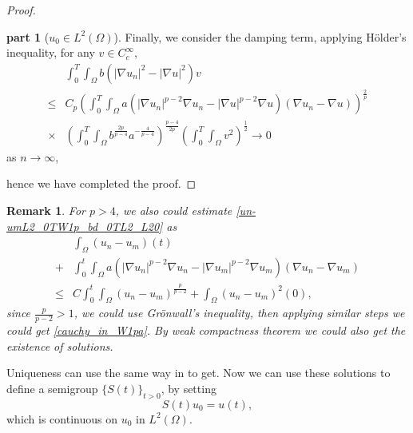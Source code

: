 \documentclass[11pt]{amsart}
\newtheorem{remark}[theorem]{Remark}
\theoremstyle{definition}
\newtheorem{proofpart}{part}
\numberwithin{equation}{section}
\newcommand*\abs[1]{\lvert#1\rvert}
\newcommand*\Brace[1]{\lbrace#1\rbrace}
\begin{document}
\begin{proof}
\begin{proofpart}[$u_0 \in L^2(\Omega)$]
	Finally, we consider the damping term, applying H\"older's inequality,
	for any $v \in C_c^\infty$,
	\begin{equation}
		\begin{split}
			& \int_0^T\int_{\Omega}b\left(\abs{\nabla u_n}^2
			- \abs{\nabla u}^2\right)v\\
			\leq{} & C_p\left(\int_0^T\int_{\Omega}a
			\left(\abs{\nabla u_n}^{p-2}\nabla u_n
			- \abs{\nabla u}^{p-2}\nabla u\right)
			\left(\nabla u_n - \nabla u\right)\right)^{\frac{2}{p}}\\
			\times{} & \left(\int_0^T\int_{\Omega}b^{\frac{2p}{p-4}}a^{-\frac{4}{p-4}}\right)^{\frac{p-4}{2p}}
			\left(\int_0^T\int_{\Omega}v^2\right)^{\frac{1}{2}} \to 0
		\end{split}
	\end{equation}
	as $n \to \infty$,
\end{proofpart}
hence we have completed the proof.
\end{proof}
\begin{remark}
	For $p>4$, we also could estimate \cref{un-umL2_0TW1p_bd_0TL2_L20} as
	\begin{equation}
		\begin{split}
			& \int_{\Omega}\left( u_n-u_m \right)(t)\\
			+{} & \int_{0}^{t}\int_{\Omega}a
			\left(\abs{\nabla u_n}^{p-2}\nabla u_n
			- \abs{\nabla u_m}^{p-2}\nabla u_m\right)
			\left(\nabla u_n - \nabla u_m\right)\\
			\leq{} & C\int_0^t\int_{\Omega}
			\left( u_n-u_m \right)^{\frac{p}{p-2}}
			+ \int_{\Omega}\left( u_n-u_m \right)^2(0),
		\end{split}
	\end{equation}
	since $\frac{p}{p-2}>1$, we could use Gr\"onwall's inequality,
	then applying similar steps we could get \cref{cauchy_in_W1pa}.
	By weak compactness theorem we could also get the existence of solutions.
\end{remark}
Uniqueness can use the same way in \cite{Zhan2019Uniquenessa}
to get. Now we can use these solutions to define a semigroup $\Brace{S(t)}_{t>0}$,
by setting
\begin{equation}
	S(t)u_0 = u(t),
\end{equation}
which is continuous on $u_{0}$ in $L^2(\Omega)$.
\end{document}
